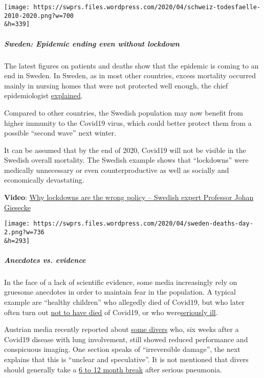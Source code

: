 \texttt{[image: https://swprs.files.wordpress.com/2020/04/schweiz-todesfaelle-2010-2020.png?w=700\\\&h=339]}

\hypertarget{sweden-epidemic-ending-even-without-lockdown}{%
\subparagraph{\texorpdfstring{\textbf{Sweden: Epidemic ending even
without
lockdown}}{Sweden: Epidemic ending even without lockdown}}\label{sweden-epidemic-ending-even-without-lockdown}}

The latest figures on patients and deaths show that the epidemic is
coming to an end in Sweden. In Sweden, as in most other countries,
excess mortality occurred mainly in nursing homes that were not
protected well enough, the chief epidemiologist
\href{https://www.washingtontimes.com/news/2020/apr/15/sweden-coronavirus-rates-easing-despite-loose-rule/}{explained}.

Compared to other countries, the Swedish population may now benefit from
higher immunity to the Covid19 virus, which could better protect them
from a possible ``second wave'' next winter.

It can be assumed that by the end of 2020, Covid19 will not be visible
in the Swedish overall mortality. The Swedish example shows that
``lockdowns'' were medically unnecessary or even counterproductive as
well as socially and economically devastating.

\textbf{Video}: \href{https://www.youtube.com/watch?v=bfN2JWifLCY}{Why
lockdowns are the wrong policy -- Swedish expert Professor Johan
Giesecke}

\texttt{[image: https://swprs.files.wordpress.com/2020/04/sweden-deaths-day-2.png?w=736\\\&h=293]}

\hypertarget{anecdotes-vs-evidence}{%
\subparagraph{\texorpdfstring{\textbf{Anecdotes vs.
evidence}}{Anecdotes vs. evidence}}\label{anecdotes-vs-evidence}}

In the face of a lack of scientific evidence, some media increasingly
rely on gruesome anecdotes in order to maintain fear in the population.
A typical example are ``healthy children'' who allegedly died of
Covid19, but who later often turn out
\href{https://www.dailymail.co.uk/news/article-8193487/Coroner-refuses-rule-COVID-19-cause-death-six-week-old-Connecticut-baby.html}{not
to have died} of Covid19, or who
were\href{https://sports.yahoo.com/spanish-football-coach-francisco-garcia-163153573.html}{seriously
ill}.

Austrian media recently reported about
\href{https://www.rainews.it/tgr/tagesschau/articoli/2020/04/tag-Coronavirus-Lungeschaden-Forschung-Uniklinik-Innsbruck-6708e11e-28dc-4843-a760-e7f926ace61c.html}{some
divers} who, six weeks after a Covid19 disease with lung involvement,
still showed reduced performance and conspicuous imaging. One section
speaks of ``irreversible damage'', the next explains that this is
``unclear and speculative''. It is not mentioned that divers should
generally take a
\href{https://www.deeperblue.com/pulmonary-considerations-in-diving/}{6
to 12 month break} after serious pneumonia.

